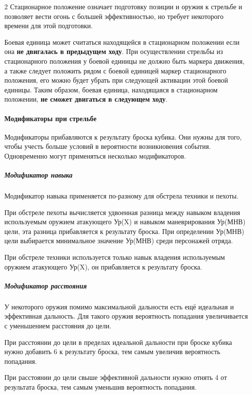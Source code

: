 \documentclass[twoside]{article}
\begin{document}
\begin{multicols}{2}
Стационарное положение означает подготовку позиции и оружия к стрельбе и
позволяет вести огонь с большей эффективностью, но требует некоторого
времени для этой подготовки.

Боевая единица может считаться находящейся в стационарном положении если
она \textbf{не двигалась в предыдущем ходу}. При осуществлении
стрельбы из стационарного положения у боевой единицы не должно быть
маркера движения, а также следует положить рядом с боевой единицей
маркер стационарного положения, его можно будет убрать при следующей
активации этой боевой единицы. Таким образом, боевая единица,
находящаяся в стационарном положении, \textbf{не сможет двигаться в
следующем ходу}.

\paragraph{Модификаторы при стрельбе}\label{shooting-modifiers}

Модификаторы прибавляются к результату броска кубика. Они нужны для
того, чтобы учесть больше условий в вероятности возникновения события.
Одновременно могут применяться несколько модификаторов.

\subparagraph{Модификатор навыка}\label{mod-skill}

Модификатор навыка применяется по-разному для обстрела техники и пехоты.

При обстреле пехоты вычисляется удвоенная разница между навыком владения
используемым оружием атакующего Ур(X) и навыком маневрирования Ур(МНВ)
цели, эта разница прибавляется к результату броска. При определении
Ур(МНВ) цели выбирается минимальное значение Ур(МНВ) среди персонажей
отряда.

При обстреле техники используется только навык владения используемым
оружием атакующего Ур(X), он прибавляется к результату броска.

\subparagraph{Модификатор расстояния}\label{mod-range}

У некоторого оружия помимо максимальной дальности есть ещё идеальная и
эффективная дальность. Для такого оружия вероятность попадания
увеличивается с уменьшением расстояния до цели.

При расстоянии до цели в пределах идеальной дальности при броске кубика
нужно добавить 6 к результату броска, тем самым увеличив вероятность
попадания.

При расстоянии до цели свыше эффективной дальности нужно отнять 4 от
результата броска, тем самым уменьшив вероятность попадания.


\end{multicols}
\end{document}

